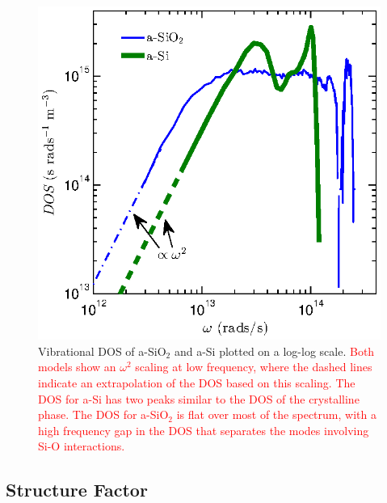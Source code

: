 \documentclass[aps,prb,onecolumn,preprint,superscriptaddress,footinbib,amsmath,amssymb,floatfix]{revtex4}
\begin{document}
\begin{figure}
\begin{center}
\includegraphics[scale=1.0]
{fig2.eps}
\vspace*{-5mm}
\end{center}
\caption{\label{FIG:DOS} Vibrational DOS of a-SiO$_2$ and a-Si 
plotted on a log-log scale. 
\textcolor{red}{
Both models show an $\omega^{2}$ scaling at low frequency, where the 
dashed lines indicate an extrapolation of the DOS based on this scaling. 
The DOS for a-Si has two peaks similar to the 
DOS of the crystalline phase.\cite{landry_effect_2010} 
The DOS for a-SiO$_2$ is flat over most of the spectrum, with a high 
frequency gap in the DOS that separates 
the modes involving Si-O interactions.\cite{mcgaughey_thermal_2004} 
}
}
\end{figure}
\vspace{100mm}

\subsection{\label{S:Structure}Structure Factor}
\end{document}
